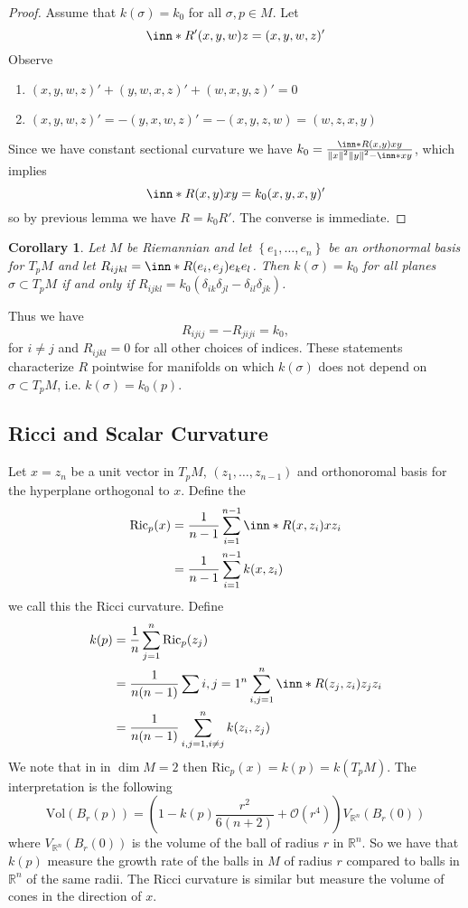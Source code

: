 \documentclass[a4paper]{article}
\newtheorem*{cor}{Corollary}
\begin{document}
\begin{proof}
  Assume that $k(\sigma) = k_0$ for all $\sigma, p \in M$. Let 
  \[
    \inn*{R'(x,y,w)}{z} = (x,y,w,z)'
  \]
  Observe 
  \begin{enumerate}
    \item $(x,y,w,z)' + (y,w,x,z)' + (w,x,y,z)' = 0$
    \item $(x,y,w,z)' = -(y,x,w,z)' = -(x,y,z,w) = (w,z,x,y)$ 
  \end{enumerate}
  Since we have constant sectional curvature we have $k_0 = \frac{\inn*{R(x,y)x}{y}}{\norm{x}^2\norm{y}^2 - \inn*{x}{y}}$, which implies
  \[
    \inn*{R(x,y)x}{y} = k_0 (x,y,x,y)'
  \]
  so by previous lemma we have $R = k_0R'$. The converse is immediate.
\end{proof}

\begin{cor}
  Let $M$ be Riemannian and let $\left\{ e_1, \dots, e_n \right\}$ be an orthonormal basis for $T_pM$ and let $R_{ijkl} = \inn*{R(e_i,e_j) e_k}{e_l}$. Then $k(\sigma) = k_0$ for all planes $\sigma \subset T_pM$ if and only if $R_{ijkl} = k_0(\delta_{ik}\delta_{jl} - \delta_{il}\delta_{jk})$. 
\end{cor}
Thus we have
\[
  R_{ijij} = -R_{jiji} = k_0,
\]
for $i \neq j$ and $R_{ijkl} = 0$ for all other choices of indices. These statements characterize $R$ pointwise for manifolds on which $k(\sigma)$ does  not depend on $\sigma \subset T_pM$, i.e. $k(\sigma) = k_0(p)$. 

\subsection*{Ricci and Scalar Curvature}%
Let $x = z_n$ be a unit vector in $T_pM$, $(z_1, \dots, z_{n-1})$ and orthonoromal basis for the hyperplane orthogonal to $x$. Define the
\[
  \begin{aligned}
    \text{Ric}_p(x) &= \frac{1}{n-1} \sum_{i=1}^{n-1} \inn*{R(x,z_i)x}{z_i}  \\
                    &= \frac{1}{n-1} \sum_{i=1}^{n-1} k(x,z_i)
  \end{aligned}
\]
we call this the Ricci curvature. Define
\[
  \begin{aligned} 
    k(p) &= \frac{1}{n} \sum_{j=1}^n \text{Ric}_p (z_j) \\
         &= \frac{1}{n(n-1)} \sum{i,j=1}^n  \sum_{i,j=1}^n \inn*{R(z_j,z_i)z_j}{z_i} \\
         &= \frac{1}{n(n-1)} \sum_{i,j=1, i\neq j}^n k(z_i,z_j)
  \end{aligned}
\]
We note that in in $\dim M =2$ then $\text{Ric}_p(x) = k(p) = k(T_pM)$. The interpretation is the following
\[
  \text{Vol}(B_r(p)) = \left(1 - k(p) \frac{r^2}{6(n+2)} + \mathcal{O}(r^4)\right) V_{\mathds{R}^n}(B_r(0))
\]
where $V_{\mathds{R}^n}(B_r(0))$ is the volume of the ball of radius $r$ in $\mathds{R}^n$. So we have that $k(p)$ measure the growth rate of the balls in $M$ of radius $r$ compared to balls in $\mathds{R}^n$ of the same radii. The Ricci curvature is similar but measure the volume of cones in the direction of $x$.
\end{document}
